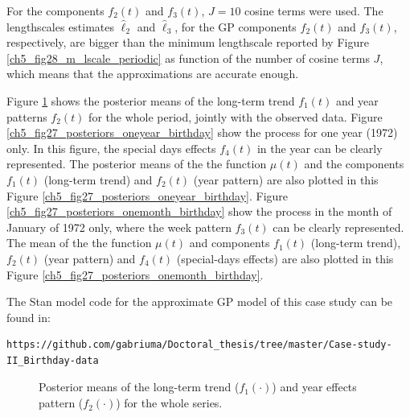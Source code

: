 \documentclass[onecolumn,a4paper,11pt]{article}
\begin{document}
For the components $f_2(t)$ and $f_3(t)$, $J=10$ cosine terms were used. The  lengthscales estimates $\hat{\ell}_2$ and $\hat{\ell}_3$, for the GP components $f_2(t)$ and $f_3(t)$, respectively, are bigger than the minimum lengthscale reported by Figure \ref{ch5_fig28_m_lscale_periodic} as function of the number of cosine terms $J$, which means that the approximations are accurate enough.

Figure \ref{ch5_fig27_posteriors_birthday} shows the posterior means of the long-term trend $f_1(t)$ and year patterns $f_2(t)$ for the whole period, jointly with the observed data. Figure \ref{ch5_fig27_posteriors_oneyear_birthday} show the process for one year (1972) only. In this figure, the special days effects $f_4(t)$ in the year can be clearly represented. The posterior means of the the function $\mu(t)$ and the components $f_1(t)$ (long-term trend) and $f_2(t)$ (year pattern) are also plotted in this Figure \ref{ch5_fig27_posteriors_oneyear_birthday}. Figure \ref{ch5_fig27_posteriors_onemonth_birthday} show the process in the month of January of 1972 only, where the week pattern $f_3(t)$ can be clearly represented. The mean of the the function $\mu(t)$ and components $f_1(t)$ (long-term trend), $f_2(t)$ (year pattern) and $f_4(t)$ (special-days effects) are also plotted in this Figure \ref{ch5_fig27_posteriors_onemonth_birthday}. 

The Stan model code for the approximate GP model of this case study can be found in:
%
\begin{lstlisting}[breaklines]
https://github.com/gabriuma/Doctoral_thesis/tree/master/Case-study-II_Birthday-data
\end{lstlisting}

\begin{figure}
\centering
{}
\caption{Posterior means of the long-term trend ($f_1(\cdot)$) and year effects pattern ($f_2(\cdot)$) for the whole series. }
  \label{ch5_fig27_posteriors_birthday}
\end{figure}
\end{document}
